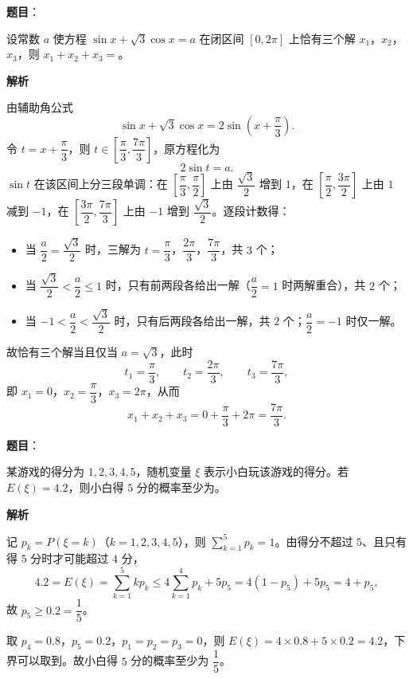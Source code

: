 \begin{answer}

\textbf{题目}：

设常数 $a$ 使方程 $\sin x+\sqrt3\cos x=a$ 在闭区间 $[0,2\pi]$ 上恰有三个解 $x_1$，$x_2$，$x_3$，则 $x_1+x_2+x_3=$\gkblank{}。

\textbf{解析}

由辅助角公式
\nopagebreak[4]
\[\sin x+\sqrt3\cos x=2\sin\left(x+\frac\pi3\right).\]
令 $t=x+\dfrac\pi3$，则 $t\in\left[\dfrac\pi3,\dfrac{7\pi}3\right]$，原方程化为
\nopagebreak[4]
\[2\sin t=a .\]
$\sin t$ 在该区间上分三段单调：在 $\left[\dfrac\pi3,\dfrac\pi2\right]$ 上由 $\dfrac{\sqrt3}2$ 增到 $1$，在 $\left[\dfrac\pi2,\dfrac{3\pi}2\right]$ 上由 $1$ 减到 $-1$，在 $\left[\dfrac{3\pi}2,\dfrac{7\pi}3\right]$ 上由 $-1$ 增到 $\dfrac{\sqrt3}2$。逐段计数得：

\begin{itemize}
\item 当 $\dfrac a2=\dfrac{\sqrt3}2$ 时，三解为 $t=\dfrac\pi3$，$\dfrac{2\pi}3$，$\dfrac{7\pi}3$，共 $3$ 个；
\item 当 $\dfrac{\sqrt3}2<\dfrac a2\leqslant1$ 时，只有前两段各给出一解（$\dfrac a2=1$ 时两解重合），共 $2$ 个；
\item 当 $-1<\dfrac a2<\dfrac{\sqrt3}2$ 时，只有后两段各给出一解，共 $2$ 个；$\dfrac a2=-1$ 时仅一解。
\end{itemize}

故恰有三个解当且仅当 $a=\sqrt3$，此时
\nopagebreak[4]
\[t_1=\frac\pi3,\qquad t_2=\frac{2\pi}3,\qquad t_3=\frac{7\pi}3,\]
即 $x_1=0$，$x_2=\dfrac\pi3$，$x_3=2\pi$，从而
\nopagebreak[4]
\[x_1+x_2+x_3=0+\frac\pi3+2\pi=\frac{7\pi}3 .\]


\end{answer}
\begin{answer}

\textbf{题目}：

某游戏的得分为 $1,2,3,4,5$，随机变量 $\xi$ 表示小白玩该游戏的得分。若 $E(\xi)=4.2$，则小白得 $5$ 分的概率至少为\gkblank{}。

\textbf{解析}

记 $p_k=P(\xi=k)$（$k=1,2,3,4,5$），则 $\sum_{k=1}^5p_k=1$。由得分不超过 $5$、且只有得 $5$ 分时才可能超过 $4$ 分，
\nopagebreak[4]
\[4.2=E(\xi)=\sum_{k=1}^5kp_k\leqslant4\sum_{k=1}^4p_k+5p_5=4(1-p_5)+5p_5=4+p_5,\]
故 $p_5\geqslant0.2=\dfrac15$。

取 $p_4=0.8$，$p_5=0.2$，$p_1=p_2=p_3=0$，则 $E(\xi)=4\times0.8+5\times0.2=4.2$，下界可以取到。故小白得 $5$ 分的概率至少为 $\dfrac15$。


\end{answer}
